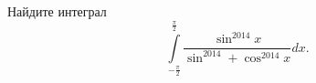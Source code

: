 \documentclass{article}
\begin{document}
Найдите интеграл $$\int\limits_{-\frac{\pi}{2}}^{\frac{\pi}{2}} \frac{\sin^{2014} x}{\sin^{2014} + \cos^{2014} x} dx.$$
\end{document}

